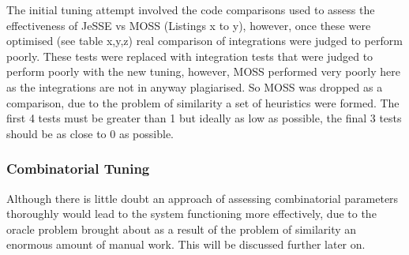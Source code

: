 \documentclass[jou,apacite]{apa6}
\begin{document}
The initial tuning attempt involved the code comparisons used to assess the effectiveness of JeSSE vs MOSS (Listings x to y), however, once these were optimised (see table x,y,z) real comparison of integrations were judged to perform poorly. These tests were replaced with integration tests that were judged to perform poorly with the new tuning, however, MOSS performed very poorly here as the integrations are not in anyway plagiarised. So MOSS was dropped as a comparison, due to the problem of similarity a set of heuristics were formed. The first 4 tests must be greater than 1 but ideally as low as possible, the final 3 tests should be as close to 0 as possible.

\subsubsection{Combinatorial Tuning}
Although there is little doubt an approach of assessing combinatorial parameters thoroughly  would lead to the system functioning more effectively, due to the oracle problem brought about as a result of the problem of similarity an enormous amount of manual work. This will be discussed further later on.





\end{document}
